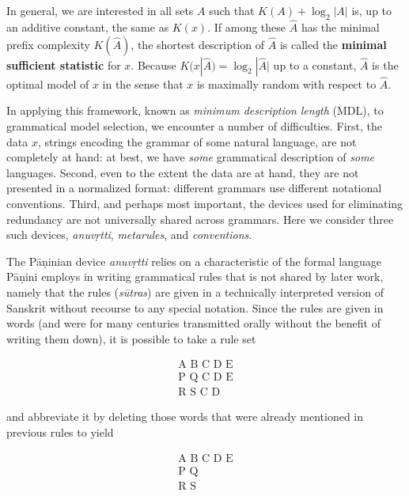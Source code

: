 In general, we are interested in all sets $A$ such that $K(A)+\log_2 |A|$ is,
up to an additive constant, the same as $K(x)$. If among these $\hat{A}$ has
the minimal prefix complexity $K(\hat{A})$, the shortest description of
$\hat{A}$ is called the {\bf minimal sufficient statistic} for
$x$. Because $K(x|\hat{A}) = \log_2
|\hat{A}|$ up to a constant, $\hat{A}$ is the optimal model of $x$ in the
sense that $x$ is maximally random with respect to $\hat{A}$.

In applying this framework, known as {\it minimum description length} (MDL),
 to grammatical model selection, we
encounter a number of difficulties. First, the data $x$, strings encoding the
grammar of some natural language, are not completely at hand: at best, we have
{\it some} grammatical description of {\it some} languages.  Second, even to
the extent the data are at hand, they are not presented in a normalized
format: different grammars use different notational conventions.  Third, and
perhaps most important, the devices used for eliminating redundancy are not
universally shared across grammars. Here we consider three such devices, {\it
  anuv\d{r}tti}, {\it metarules}, and {\it conventions}.

The P\={a}\d{n}inian device {\it anuv\d{r}tti}
relies on a characteristic of the formal language
P\={a}\d{n}ini employs in writing grammatical rules that is not shared by
later work, namely that the rules ({\it s\={u}tras}) are given in a
technically interpreted version of Sanskrit without recourse to any special
notation. Since the rules are given in words (and were for many centuries
transmitted orally without the benefit of writing them down), it is possible
to take a rule set

\begin{eqnarray}
\text{A B C D E}\\
\text{P Q C D E}\\
\text{R S C D \ \ \ }
\end{eqnarray}

\noindent
and abbreviate it by deleting those words that were already mentioned in 
previous rules to yield

\begin{eqnarray}
\text{A B C D E}\\
\text{P Q\ \ \ \ \ \ \ \ \ \ }\\
\text{R S\ \ \ \ \ \ \ \ \ \ }
\end{eqnarray}

